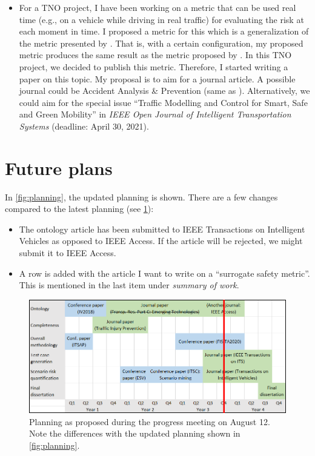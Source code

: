 \documentclass[10pt,final,a4paper,oneside,onecolumn]{article}
\begin{document}
\begin{itemize}
	 \item For a TNO project, I have been working on a metric that can be used real time (e.g., on a vehicle while driving in real traffic) for evaluating the risk at each moment in time.
	 I proposed a metric for this which is a generalization of the metric presented by \autocite{wang2014evaluation}.
	 That is, with a certain configuration, my proposed metric produces the same result as the metric proposed by \textcite{wang2014evaluation}.
	 In this TNO project, we decided to publish this metric. 
	 Therefore, I started writing a paper on this topic.
	 My proposal is to aim for a journal article. 
	 A possible journal could be Accident Analysis \& Prevention (same as \autocite{wang2014evaluation}).
	 Alternatively, we could aim for the special issue ``Traffic Modelling and Control for Smart, Safe and Green Mobility'' in \emph{IEEE Open Journal of Intelligent Transportation Systems} (deadline: April 30, 2021).
\end{itemize}

\section{Future plans}

In \cref{fig:planning}, the updated planning is shown. There are a few changes compared to the latest planning (see \cref{fig:old planning}):
\begin{itemize}
	\item The ontology article has been submitted to IEEE Transactions on Intelligent Vehicles as opposed to IEEE Access. 
	If the article will be rejected, we might submit it to IEEE Access.
	
	\item A row is added with the article I want to write on a ``surrogate safety metric''. This is mentioned in the last item under \emph{summary of work}.
\end{itemize}

\begin{figure}[t]
	\centering
	\includegraphics[width=\linewidth]{planning.png}
	\caption{Planning as proposed during the progress meeting on August 12. Note the differences with the updated planning shown in \cref{fig:planning}.}
	\label{fig:old planning}
\end{figure}
\end{document}

